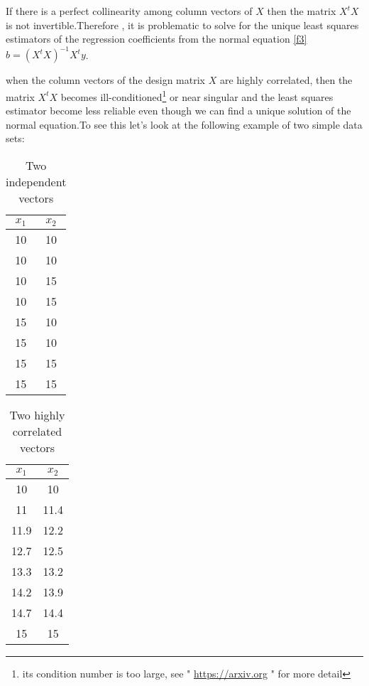 \documentclass[12pt]{report}
\begin{document}
\begin{description}
		If there is a perfect collinearity among column vectors of $X$ then  the matrix $X^{t}X$ is not invertible.Therefore , it is problematic to solve for the unique least squares estimators of the regression coefficients from the normal equation \eqref{f3} $b=(X^{t}X)^{-1}X^{t}y$.
		
		when the column vectors of the design matrix $X$ are highly correlated, then the matrix $X^{t}X$ becomes ill-conditioned\footnote{ its condition number is too large, see " \url{https://arxiv.org} " for more detail} or near singular and the least squares estimator become less reliable even though we can find a unique solution of the normal equation.To see this let's look at the following example of two simple data sets:
		
		\begin{minipage}{0.49\textwidth}
			\begin{table}[H]
				\begin{center}
					\begin{tabular}{|c|c|}
						\hline
						$x_{1}$ & $x_{2}$ \\
						\hline
						10&10\\
						\hline
						10&10\\
						\hline
						10&15\\
						\hline
						10&15\\
						\hline
						15&10\\
						\hline
						15&10\\
						\hline
						15&15\\
						\hline
						15&15\\
						\hline
					\end{tabular}
				\end{center}
				\caption{Two independent vectors}
				\label{fig2}
			\end{table}
		\end{minipage}
		\hspace{4ex}
		\begin{minipage}{0.49\textwidth}
			\begin{table}[H]
				\begin{center}
					\begin{tabular}{|c|c|}
						\hline
						$x_{1}$ & $x_{2}$ \\
						\hline
						10&10\\
						\hline
						11&11.4\\
						\hline
						11.9&12.2\\
						\hline
						12.7&12.5\\
						\hline
						13.3&13.2\\
						\hline
						14.2&13.9\\
						\hline
						14.7&14.4\\
						\hline
						15&15\\
						\hline
					\end{tabular}
				\end{center}
				\caption{Two highly correlated vectors}
				\label{fig3}
			\end{table}
		\end{minipage} \newline
		

\end{description}
\end{document}
